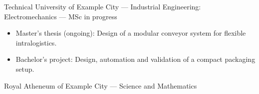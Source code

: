 
\begin{education}
    {Technical University of Example City --- Industrial Engineering: Electromechanics --- MSc in progress
        \begin{itemize}
            \item Master's thesis (ongoing): Design of a modular conveyor system for flexible intralogistics.
            \item Bachelor's project: Design, automation and validation of a compact packaging setup.
        \end{itemize}
    }
    {Royal Atheneum of Example City --- Science and Mathematics}
\end{education}
